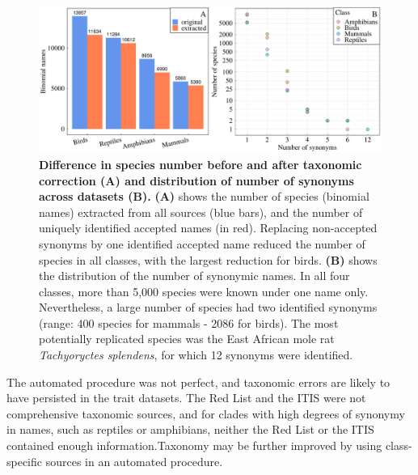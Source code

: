\vspace{0.5cm}
\begin{figure}[h!]
\includegraphics[scale=0.45]{Supporting/Chapter2/Figures/tax_corrections}
\caption[Difference in species number before and after taxonomic correction (A) and distribution of number of synonyms across datasets (B)]{\textbf{Difference in species number before and after taxonomic correction (A) and distribution of number of synonyms across datasets (B).} \textbf{(A)} shows the number of species (binomial names) extracted from all sources (blue bars), and the number of uniquely identified accepted names (in red). Replacing non-accepted synonyms by one identified accepted name reduced the number of species in all classes, with the largest reduction for birds. \textbf{(B)} shows the distribution of the number of synonymic names. In all four classes, more than 5,000 species were known under one name only. Nevertheless, a large number of species had two identified synonyms (range: 400 species for mammals - 2086 for birds). The most potentially replicated species was the East African mole rat \textit{Tachyoryctes splendens}, for which 12 synonyms were identified.}
\label{SI2_taxcor}
\end{figure}


The automated procedure was not perfect, and taxonomic errors are likely to have persisted in the trait datasets. The Red List and the ITIS were not comprehensive taxonomic sources, and for clades with high degrees of synonymy in names, such as reptiles or amphibians, neither the Red List or the ITIS contained enough information.Taxonomy may be further improved by using class-specific sources in an automated procedure. 

